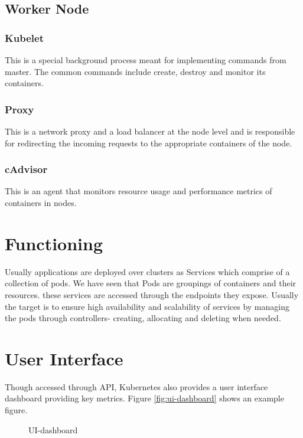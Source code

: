 \documentclass[9pt,twocolumn,twoside]{../../styles/osajnl}
\begin{document}
\subsection{Worker Node}
\subsubsection{Kubelet}
This is a special background process meant for implementing commands from master. The common commands include create, destroy and monitor its containers.
\subsubsection{Proxy}
This is a network proxy and a load balancer at the node level and is responsible for redirecting the incoming requests to the appropriate containers of the node.
\subsubsection{cAdvisor}
This is an agent that monitors resource usage and performance metrics of containers in nodes.
\section{Functioning}

Usually applications are deployed over clusters as Services which comprise of a collection of pods. We have seen that Pods are groupings of containers and their resources. these services are accessed through the endpoints they expose. Usually the target is to ensure high availability and scalability of services by managing the pods through controllers- creating, allocating and deleting when needed.
\section{User Interface}
Though accessed through API, Kubernetes also provides 
a user interface dashboard providing key metrics.
Figure \ref{fig:ui-dashboard} shows an example figure.

\begin{figure}[htbp]
\centering
{}
\caption{UI-dashboard \cite{www-kubernetesuidoc}}
\label{fig:Kubernetes UI-dashboard}
\end{figure}
\end{document}
